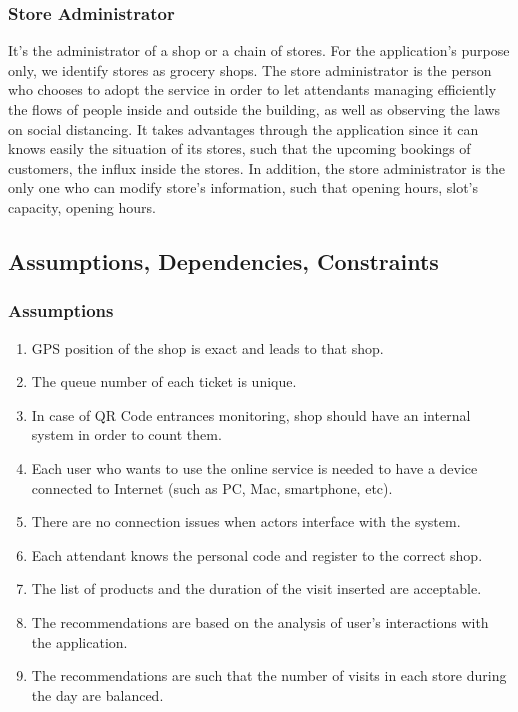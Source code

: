 \documentclass[table, 12pt]{article}
\begin{document}
\begin{flushleft}
    \subsubsection{Store Administrator}
    It's the administrator of a shop or a chain of stores. For the application's purpose only, we identify stores as grocery shops. The store administrator is the person who chooses to adopt the service in order to let attendants managing efficiently the flows of people inside and outside the building, as well as observing the laws on social distancing. It takes advantages through the application since it can knows easily the situation of its stores, such that the upcoming bookings of customers, the influx inside the stores. In addition, the store administrator is the only one who can modify store's information, such that opening hours, slot's capacity, opening hours.

    \subsection{Assumptions, Dependencies, Constraints}
    \subsubsection{Assumptions}
    \begin{enumerate}[label=\textbf{D\arabic*}:]
        \item GPS position of the shop is exact and leads to that shop.
        \item The queue number of each ticket is unique.
        \item In case of QR Code entrances monitoring, shop should have an internal system in order to count them.
        \item Each user who wants to use the online service is needed to have a device connected to Internet (such as PC, Mac, smartphone, etc).
        \item There are no connection issues when actors interface with the system.
        \item Each attendant knows the personal code and register to the correct shop.
        \item The list of products and the duration of the visit inserted are acceptable.
        \item The recommendations are based on the analysis of user's interactions with the application.
        \item The recommendations are such that the number of visits in each store during the day are balanced.
    \end{enumerate}


\end{flushleft}
\end{document}
